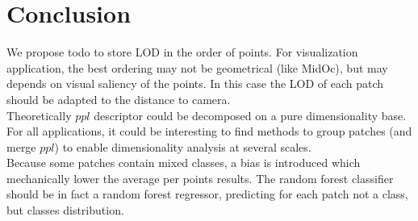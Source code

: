 

\section{Conclusion} 
	We propose 
	todo 
	to store LOD in the order of points. For visualization application, the best ordering may not be geometrical (like MidOc), but may depends on visual saliency of the points. In this case the LOD of each patch should be adapted to the distance to camera.
	\\
	Theoretically $ppl$ descriptor could be decomposed on a pure dimensionality base.
	For all applications, it could be interesting to find methods to group patches (and merge $ppl$) to enable dimensionality analysis at several scales.
	\\
	Because some patches contain mixed classes, a bias is introduced which mechanically lower the average per points results. The random forest classifier should be in fact a random forest regressor, predicting for each patch not a class, but classes distribution.
	 